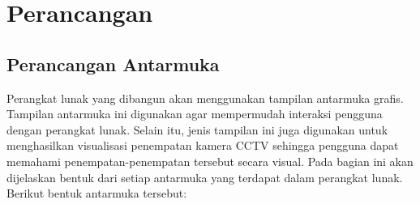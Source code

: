 \chapter{Perancangan}

\section{Perancangan Antarmuka}
Perangkat lunak yang dibangun akan menggunakan tampilan antarmuka grafis. Tampilan antarmuka ini digunakan agar mempermudah interaksi pengguna dengan perangkat lunak. Selain itu, jenis tampilan ini juga digunakan untuk menghasilkan visualisasi penempatan kamera CCTV sehingga pengguna dapat memahami penempatan-penempatan tersebut secara visual. Pada bagian ini akan dijelaskan bentuk dari setiap antarmuka yang terdapat dalam perangkat lunak. Berikut bentuk antarmuka tersebut:

